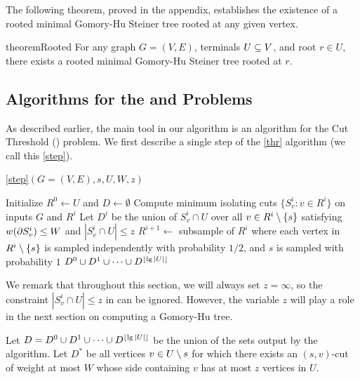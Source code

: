 The following theorem, proved in the appendix, establishes the existence of a rooted minimal Gomory-Hu Steiner tree rooted at any given vertex.

\begin{restatable}{theorem}{Rooted}
For any graph $G=(V,E)$, terminals $U\subseteq V$, and root $r\in U$, there exists a rooted minimal Gomory-Hu Steiner tree rooted at $r$.
\end{restatable}


\subsection{Algorithms for the \ct and \ssc Problems}

As described earlier, the main tool in our \ssc algorithm is an algorithm for the Cut Threshold (\ct) problem. We first describe a single step of the \ref{thr} algorithm (we call this \ref{step}). 


\begin{algorithm}
\caption{\ref{step}$(G=(V,E),s,U,W,z)$} 
\begin{algorithmic}[1]
\State Initialize $R^0\gets U$ and $D\gets\emptyset$
 \State Compute minimum isolating cuts $\{S^i_v:v\in R^i\}$ on inputs $G$ and $R^i$ 
 \State Let $D^i$ be the union of $S^i_v\cap U$ over all $v\in R^i\setminus \{s\}$ satisfying $w(\partial S^i_v)\le W$ and $|S^i_v\cap U|\le z$
 \State $R^{i+1}\gets$ subsample of $R^i$ where each vertex in $R^i\setminus \{s\}$ is sampled independently with probability $1/2$, and $s$ is sampled with probability $1$
\EndFor
\State\Return $D^0\cup D^1\cup \cdots\cup D^{\lfloor\lg|U|\rfloor}$
\end{algorithmic}
\end{algorithm}

We remark that throughout this section, we will always set $z=\infty$, so the constraint $|S^i_v\cap U|\le z$ in  can be ignored. However, the variable $z$ will play a role in the next section on computing a Gomory-Hu tree.

Let $D=D^0\cup D^1\cup \cdots\cup D^{\lfloor\lg|U|\rfloor}$ be the union of the sets output by the algorithm. Let $D^*$ be all vertices $v\in U\setminus s$ for which there exists an $(s,v)$-cut of weight at most $W$ whose side containing $v$ has at most $z$ vertices in $U$.  

